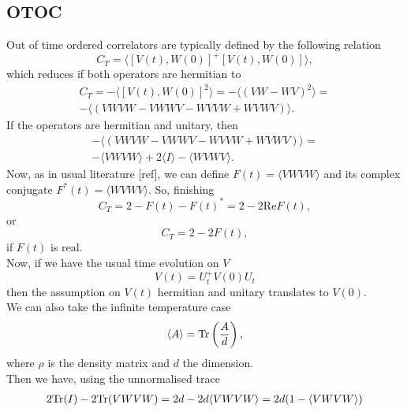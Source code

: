 \documentclass{article}
\begin{document}
\subsection{OTOC}
Out of time ordered correlators are typically defined by the following relation
\begin{equation}
    C_T = \langle[V(t),W(0)]^+[V(t),W(0)]\rangle,
\end{equation}
which reduces if both operators are hermitian to
\begin{multline}
    C_T = -\langle[V(t),W(0)]^2\rangle = -\langle(VW-WV)^2\rangle = \\-\langle(VWVW-VWWV-WVVW+WVWV)\rangle.
\end{multline}
If the operators are hermitian and unitary, then
\begin{multline}
   -\langle(VWVW-VWWV-WVVW+WVWV)\rangle = \\ 
   -\langle VWVW\rangle+2\langle I\rangle-\langle WVWV\rangle.
\end{multline}
Now, as in usual literature [ref], we can define $F(t) = \langle VWVW\rangle$ and its complex conjugate $F^*(t) = \langle WVWV\rangle$. So, finishing 
\begin{equation}
    C_T = 2 - F(t) - F(t)^* = 2 - 2\mathrm{Re} F(t),
\end{equation}
or 
\begin{equation}
    C_T = 2 - 2F(t),
\end{equation}
if $F(t)$ is real.\\
Now, if we have the usual time evolution on $V$
\begin{equation}
    V(t) = U^+_tV(0)U_t
\end{equation}
then the assumption on $V(t)$ hermitian and unitary translates to $V(0)$.\\
We can also take the infinite temperature case
\begin{equation}
    \langle A\rangle = \text{Tr}\left(\frac{A}{d}\right),
\end{equation} 
where $\rho$ is the density matrix and $d$ the dimension.\\
Then we have, using the unnormalised trace
\begin{multline}
    2\text{Tr}(I) - 2\text{Tr}(VWVW) = 2d - 2d\langle VWVW\rangle = 2d(1-\langle VWVW\rangle )
\end{multline}
\end{document}
